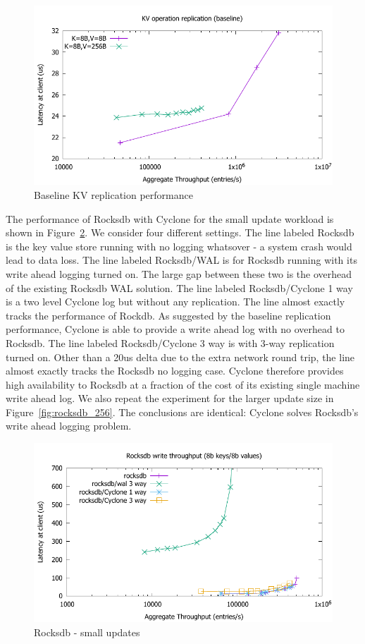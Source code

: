 \documentclass[10pt, preprint, nonatbib]{sigplanconf}
\begin{document}
\begin{figure}
\includegraphics[scale=0.6]{results2/kv_baseline.pdf}
\caption{Baseline KV replication performance}
\label{fig:kv_baseline}
\end{figure}

The performance of Rocksdb with Cyclone for the small update workload is shown
in Figure~\ref{fig:rocksdb}. We consider four different settings. The line
labeled Rocksdb is the key value store running with no logging whatsover - a
system crash would lead to data loss. The line labeled Rocksdb/WAL is for
Rocksdb running with its write ahead logging turned on. The large gap between
these two is the overhead of the existing Rocksdb WAL solution. The line labeled
Rocksdb/Cyclone 1 way is a two level Cyclone log but without any
replication. The line almost exactly tracks the performance of Rockdb. As
suggested by the baseline replication performance, Cyclone is able to provide a
write ahead log with no overhead to Rocksdb. The line labeled Rocksdb/Cyclone 3
way is with 3-way replication turned on. Other than a 20us delta due to the
extra network round trip, the line almost exactly tracks the Rocksdb no logging
case. Cyclone therefore provides high availability to Rocksdb at a fraction of
the cost of its existing single machine write ahead log. We also repeat the
experiment for the larger update size in Figure~\ref{fig:rocksdb_256}. The
conclusions are identical: Cyclone solves Rocksdb's write ahead logging
problem.

\begin{figure}
\includegraphics[scale=0.6]{results2/rocksdb.pdf}
\caption{Rocksdb - small updates}
\label{fig:rocksdb}
\end{figure}
\end{document}
